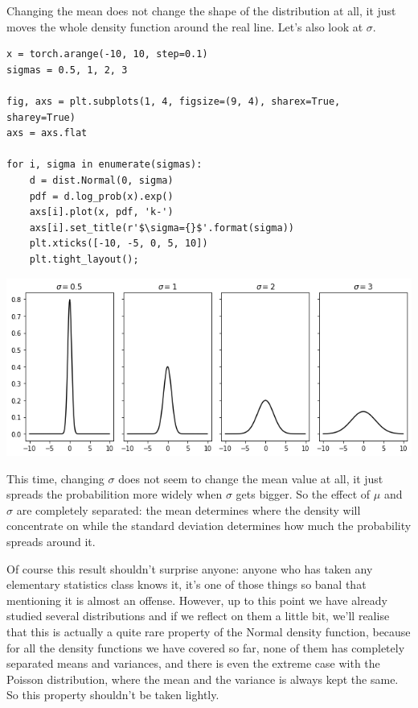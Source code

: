 \documentclass[11pt]{article}
\begin{document}
Changing the mean does not change the shape of the distribution at all, it just moves the whole density function around the real line. Let's also look at \(\sigma\).

\begin{verbatim}
x = torch.arange(-10, 10, step=0.1)
sigmas = 0.5, 1, 2, 3

fig, axs = plt.subplots(1, 4, figsize=(9, 4), sharex=True, sharey=True)
axs = axs.flat

for i, sigma in enumerate(sigmas):
    d = dist.Normal(0, sigma)
    pdf = d.log_prob(x).exp()
    axs[i].plot(x, pdf, 'k-')
    axs[i].set_title(r'$\sigma={}$'.format(sigma))
    plt.xticks([-10, -5, 0, 5, 10])
    plt.tight_layout();
\end{verbatim}

\begin{center}
\includegraphics[width=.9\linewidth]{./.ob-jupyter/21dae2b6eb42c8486a45650ed198bfb1ed3e5650.png}
\end{center}


This time, changing \(\sigma\) does not seem to change the mean value at all, it just spreads the probabilition more widely when \(\sigma\) gets bigger. So the effect of \(\mu\) and \(\sigma\) are completely separated: the mean determines where the density will concentrate on while the standard deviation determines how much the probability spreads around it.

Of course this result shouldn't surprise anyone: anyone who has taken any elementary statistics class knows it, it's one of those things so banal that mentioning it is almost an offense. However, up to this point we have already studied several distributions and if we reflect on them a little bit, we'll realise that this is actually a quite rare property of the Normal density function, because for all the density functions we have covered so far, none of them has completely separated means and variances, and there is even the extreme case with the Poisson distribution, where the mean and the variance is always kept the same. So this property shouldn't be taken lightly.
\end{document}
